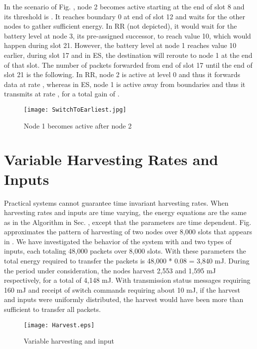 \documentclass[12 pt]{article}
\newcommand{\debug}[1]{\mbox{\tt #1}}
\renewcommand{\debug}[1]{}              \newcommand{\cmd}[1]{}
\newcommand{\msec}[2]{\renewcommand{\sname}{}\section[#1
	\debug{\fbox {#2}}]{#1 \cmd{msec} \dlabelx{#2}}\markboth{\today}{Sec. \thesection}}
\begin{document}
In the scenario of Fig. , node 2 becomes active starting at the end of slot 8 and its threshold is . It reaches boundary 0 at end of slot 12 and waits for the other nodes to gather sufficient energy.  In RR (not depicted), it would wait for the battery level at node 3, its pre-assigned successor, to reach value 10, which would happen during slot 21.   However, the battery level at node 1 reaches value 10 earlier, during slot 17 and in ES, the destination will reroute to node 1 at the end of that slot.  The number of packets forwarded from end of slot 17 until the end of slot 21 is the following. In RR, node 2 is active at level 0 and thus it forwards data at rate , whereas in ES, node 1 is active away from boundaries and thus it transmits at rate , for a total gain of .

\begin{figure}[hbtp]
\begin{center}
\texttt{[image: SwitchToEarliest.jpg]}
\caption{Node 1 becomes active after node 2\debug{\fbox{fig-case6}}\label{fig-case6}}
\end{center}
\end{figure}


\msec{Variable Harvesting Rates and Inputs}{variableV}

Practical systems cannot guarantee time invariant harvesting rates.  When harvesting rates and inputs are time varying, the energy equations are the same as in the Algorithm in Sec. , except that the parameters  are time dependent.
Fig. approximates the pattern of harvesting of two nodes over 8,000 slots that appears in .  We have investigated the behavior of the system with  and two types of inputs, each totaling 48,000 packets over 8,000 slots.  With these parameters the total energy required to transfer the packets is 48,000 * 0.08 = 3,840 mJ.  During the period under consideration, the nodes harvest 2,553 and 1,595 mJ respectively, for a total of 4,148 mJ.  With transmission status messages requiring 160 mJ and receipt of switch commands requiring about 10 mJ, if the harvest and inputs were uniformly distributed, the harvest would have been more than sufficient to transfer all packets.

\begin{figure}[hbtp]
\begin{center}
\texttt{[image: Harvest.eps]}
\caption{Variable harvesting and input\debug{\fbox{fig-Harvest}}\label{fig-Harvest}}
\end{center}
\end{figure}
\end{document}
